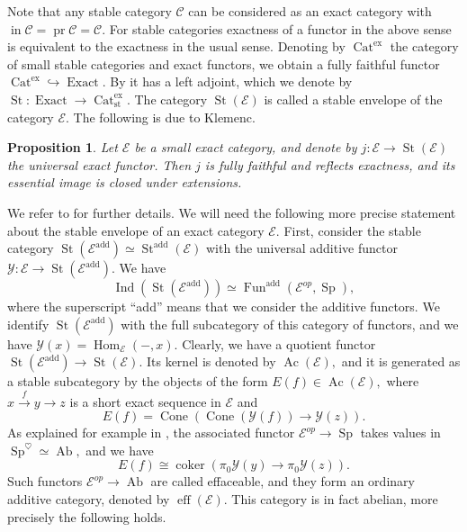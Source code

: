 \documentclass[11pt,leqno]{amsart}
\newtheorem{prop}[theo]{Proposition}
\numberwithin{equation}{section}
\def\Hom{\operatorname{Hom}}
\newcommand{\xto}{\xrightarrow}
\newcommand{\hto}{\hookrightarrow}
\newcommand{\Cat}{\operatorname{Cat}}
\newcommand{\Cone}{\operatorname{Cone}}
\newcommand{\eff}{\operatorname{eff}}
\newcommand{\ex}{\operatorname{ex}}
\newcommand{\St}{\operatorname{St}}
\newcommand{\st}{\operatorname{st}}
\newcommand{\cC}{{\mathcal C}}
\newcommand{\cE}{{\mathcal E}}
\newcommand{\cY}{{\mathcal Y}}
\newcommand{\Fun}{\operatorname{Fun}}
\newcommand{\Ab}{\operatorname{Ab}}
\newcommand{\Exact}{\operatorname{Exact}}
\newcommand{\coker}{\operatorname{coker}}
\newcommand{\Sp}{\operatorname{Sp}}
\newcommand{\add}{\operatorname{add}}
\newcommand{\Ind}{\operatorname{Ind}}
\newcommand{\Ac}{\operatorname{Ac}}
\newcommand{\iin}{\operatorname{in}}
\newcommand{\pr}{\operatorname{pr}}
\begin{document}
Note that any stable category $\cC$ can be considered as an exact category with $\iin\cC=\pr\cC=\cC.$ For stable categories exactness of a functor in the above sense is equivalent to the exactness in the usual sense. Denoting by $\Cat^{\ex}$ the category of small stable categories and exact functors, we obtain a fully faithful functor $\Cat^{\ex}\hto \Exact.$ By \cite[Proposition 4.22, Corollary 4.24]{Kle} it has a left adjoint, which we denote by $\St:\Exact\to\Cat^{\ex}_{\st}.$ The category $\St(\cE)$ is called a stable envelope of the category $\cE.$ The following is due to Klemenc.

\begin{prop}\cite[Propositions 4.17, Proposition 4.25]{Kle}\label{prop:fully_faithful_E_to_St_of_E}
Let $\cE$ be a small exact category, and denote by $j:\cE\to\St(\cE)$ the universal exact functor. Then $j$ is fully faithful and reflects exactness, and its essential image is closed under extensions. 
\end{prop}

We refer to \cite{SW26} for further details. We will need the following more precise statement about the stable envelope of an exact category $\cE.$ First, consider the stable category $\St(\cE^{\add})\simeq\St^{\add}(\cE)$ with the universal additive functor $\cY:\cE\to\St(\cE^{\add}).$ We have
\begin{equation*}
\Ind(\St(\cE^{\add}))\simeq\Fun^{\add}(\cE^{op},\Sp),
\end{equation*}
where the superscript ``add'' means that we consider the additive functors. We identify $\St(\cE^{\add})$ with the full subcategory of this category of functors, and we have $\cY(x)=\Hom_{\cE}(-,x).$ Clearly, we have a quotient functor $\St(\cE^{\add})\to\St(\cE).$ Its kernel is denoted by $\Ac(\cE),$ and it is generated as a stable subcategory by the objects of the form $E(f)\in\Ac(\cE),$ where $x\xto{f}y\to z$ is a short exact sequence in $\cE$ and
\begin{equation}\label{eq:object_E_of_f}
E(f)=\Cone(\Cone(\cY(f))\to \cY(z)).
\end{equation}
As explained for example in \cite[Proposition 3.9]{SW26}, the associated functor $\cE^{op}\to\Sp$ takes values in $\Sp^{\heartsuit}\simeq\Ab,$ and we have
\begin{equation*}
E(f)\cong \coker(\pi_0\cY(y)\to\pi_0\cY(z)).
\end{equation*} 
Such functors $\cE^{op}\to\Ab$ are called effaceable, and they form an ordinary additive category, denoted by $\eff(\cE).$ This category is in fact abelian, more precisely the following holds.
\end{document}
